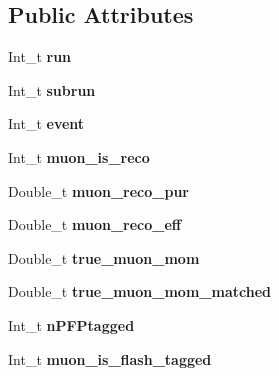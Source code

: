 \subsection*{Public Attributes}
\begin{DoxyCompactItemize}
\item 
\hypertarget{classUBXSecEvent_ad26e1c100cfe11d9f7c48a3760cdcc07}{Int\-\_\-t {\bfseries run}}\label{classUBXSecEvent_ad26e1c100cfe11d9f7c48a3760cdcc07}

\item 
\hypertarget{classUBXSecEvent_a15ac0be3ec941ed67ee78d27da704abb}{Int\-\_\-t {\bfseries subrun}}\label{classUBXSecEvent_a15ac0be3ec941ed67ee78d27da704abb}

\item 
\hypertarget{classUBXSecEvent_a5833c043eb96d5d41935cd1c6eaec722}{Int\-\_\-t {\bfseries event}}\label{classUBXSecEvent_a5833c043eb96d5d41935cd1c6eaec722}

\item 
\hypertarget{classUBXSecEvent_af0c722b0acf00550d5c88299ae5707b6}{Int\-\_\-t {\bfseries muon\-\_\-is\-\_\-reco}}\label{classUBXSecEvent_af0c722b0acf00550d5c88299ae5707b6}

\item 
\hypertarget{classUBXSecEvent_ac1391d470b732d86bb9e462d49fff185}{Double\-\_\-t {\bfseries muon\-\_\-reco\-\_\-pur}}\label{classUBXSecEvent_ac1391d470b732d86bb9e462d49fff185}

\item 
\hypertarget{classUBXSecEvent_aa713bc31919706a03a5a11034dcbda7c}{Double\-\_\-t {\bfseries muon\-\_\-reco\-\_\-eff}}\label{classUBXSecEvent_aa713bc31919706a03a5a11034dcbda7c}

\item 
\hypertarget{classUBXSecEvent_a967af89c3282493ba4ec96a4bf1592e9}{Double\-\_\-t {\bfseries true\-\_\-muon\-\_\-mom}}\label{classUBXSecEvent_a967af89c3282493ba4ec96a4bf1592e9}

\item 
\hypertarget{classUBXSecEvent_ac01db50f50e39aed219935666f441aed}{Double\-\_\-t {\bfseries true\-\_\-muon\-\_\-mom\-\_\-matched}}\label{classUBXSecEvent_ac01db50f50e39aed219935666f441aed}

\item 
\hypertarget{classUBXSecEvent_a64e18b32773515202fcb167d1818133b}{Int\-\_\-t {\bfseries n\-P\-F\-Ptagged}}\label{classUBXSecEvent_a64e18b32773515202fcb167d1818133b}

\item 
\hypertarget{classUBXSecEvent_a33857278922a2779d3daaf30624a2462}{Int\-\_\-t {\bfseries muon\-\_\-is\-\_\-flash\-\_\-tagged}}\label{classUBXSecEvent_a33857278922a2779d3daaf30624a2462}


\end{DoxyCompactItemize}
